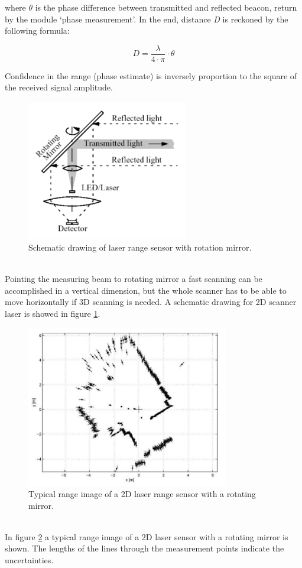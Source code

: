 where \textit{$\theta$} is the phase difference between transmitted
and reflected beacon, return by the module `phase measurement'.
In the end, distance \textit{D} is reckoned by the following formula:

\[
D = \frac{\lambda}{4\cdot\pi}\cdot{\theta}
\]

Confidence in the range (phase estimate) is inversely proportion to
the square of the received signal amplitude.
\begin{figure} [h]
  \begin{center}
    \includegraphics[width=200pt]{img/laser_rotation.png}
    \caption{Schematic drawing of laser range sensor with
      rotation mirror.}
    \label{fig:laser_rotation}
  \end{center}
\end{figure}
\\
Pointing the measuring beam
to rotating mirror a fast scanning can be accomplished in a vertical
dimension, but the whole scanner has to be able to move horizontally
if 3D scanning is needed. A schematic drawing for 2D scanner laser
is showed in figure \ref{fig:laser_rotation}.
\begin{figure} [!h]
  \begin{center}
    \includegraphics[width=250pt]{img/laser_scan_map.png}
    \caption{Typical range image of a 2D laser range sensor with a
      rotating mirror.}
    \label{fig:laser_scan_map}
  \end{center}
\end{figure}
\\
In figure \ref{fig:laser_scan_map} a typical range image of a 2D
laser sensor with
a rotating mirror is shown. The lengths of the lines through the
measurement points indicate the uncertainties.


